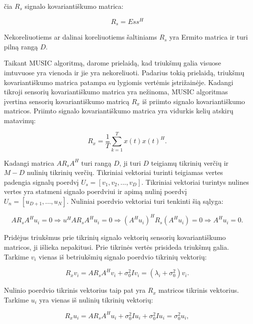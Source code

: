 \documentclass[main.tex]{subfiles}
\begin{document}
\noindent čia $R_s$ signalo kovariantiškumo matrica:

\begin{equation}
    R_s=E{ss^H}
\end{equation}

\noindent Nekoreliuotiems ar dalinai koreliuotiems šaltiniams $R_s$ yra Ermito matrica
ir turi pilną rangą $D$.

Taikant MUSIC algoritmą, darome prielaidą, kad triukšmų galia visuose imtuvuose yra vienoda
ir jie yra nekoreliuoti. Padarius tokią prielaidą, triukšmų kovariantiškumo matrica patampa
su lygiomis vertėmis įstrižainėje. Kadangi tikroji sensorių kovariantiškumo matrica
yra nežinoma, MUSIC algoritmas įvertina sensorių kovariantiškumo matricą $R_x$
iš priimto signalo kovariantiškumo matricos. Priimto signalo kovariantiškumo matrica
yra vidurkis kelių atskirų matavimų:

\begin{equation}
    R_x = \frac{1}{T} \sum^T_{k=1} {x(t)x(t)^H}.
\end{equation}

Kadangi matrica $AR_sA^H$ turi rangą $D$, ji turi $D$ teigiamų tikrinių verčių ir
$M-D$ nulinių tikrinių verčių.
Tikriniai vektoriai turinti teigiamas vertes padengia signalų poerdvį $U_s=[v_1,v_2,...,v_D]$.
Tikriniai vektoriai turintys nulines vertes yra statmeni signalo poerdviui ir apimą
nulinį poerdvį $U_n=[u_{D+1},...,u_N]$. Nuliniai poerdvio vektoriai turi tenkinti
šią sąlyga:

\begin{equation}
    AR_sA^Hu_i=0 \Rightarrow u^HAR_sA^Hu_i = 0 \Rightarrow (A^Hu_i)^HR_s(A^Hu_i)=0 \Rightarrow A^Hu_i=0.
\end{equation}

Pridėjus triukšmus prie tikrinių signalo vektorių sensorių kovariantiškumo matricos, ji
išlieka nepakitusi. Prie tikrinės vertės prisideda triukšmų galia. Tarkime
$v_i$ vienas iš betriukšmių signalo poerdvio tikrinių vektorių:

\begin{equation}
    R_xv_i=AR_sA^Hv_i+\sigma^2_0Iv_i = (\lambda_i + \sigma^2_0)v_i.
\end{equation}

\noindent Nulinio poerdvio tikrinis vektorius taip pat yra $R_x$ matricos tikrinis
vektorius. Tarkime $u_i$ yra vienas iš nulinių tikrinių vektorių:

\begin{equation}
    R_xu_i=AR_sA^Hu_i+\sigma^2_0Iu_i+\sigma^2_0Iu_i=\sigma^2_0u_i,
\end{equation}
\end{document}
